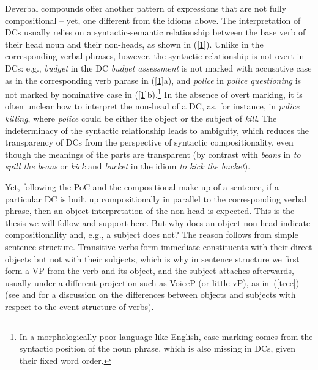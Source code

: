 \documentclass[output=paper]{langsci/langscibook}
\begin{document}
 {Deverbal compounds offer another pattern of expressions that are not fully compositional -- yet, one different from the idioms above. The interpretation of DCs usually relies on a syntactic-semantic relationship between the base verb of their head noun and their non-heads, as shown in (\ref{1}). Unlike in the corresponding verbal phrases, however, the syntactic relationship is not overt in DCs: e.g., \textit{budget} in the DC \textit{budget assessment} is not marked with accusative case as in the corresponding verb phrase in (\ref{1}a), and \textit{police} in \textit{police questioning} is not marked by nominative case in (\ref{1}b).}\footnote{ {In a morphologically poor language like English,  case marking comes from the syntactic position of the noun phrase, which is also missing in DCs, given their fixed word order.}}  {In the absence of overt marking, it is often unclear how to interpret the non-head of a DC, as, for instance, in \textit{police killing}, where \textit{police} could be either the object or the subject of \textit{kill}. The indeterminacy of the syntactic relationship leads to ambiguity, which reduces the transparency of DCs from the perspective of syntactic compositionality, even though the meanings of the parts are transparent (by contrast with \textit{beans} in \textit{to spill the beans} or \textit{kick} and \textit{bucket} in the idiom \textit{to kick the bucket}).}


 {Yet, following the PoC and the compositional make-up of a sentence, if a particular DC is built up compositionally in parallel to the corresponding verbal phrase, then an object interpretation of the non-head is expected. This is the thesis we will follow and support  here. But why does an object non-head indicate compositionality and, e.g., a subject does not? The reason follows from simple sentence structure. Transitive verbs form immediate constituents with their direct objects but not with their subjects, which is why in sentence structure we first form a VP from the verb and its object, and the subject attaches afterwards, usually under a different projection such as VoiceP (or little vP), as in~(\ref{tree}) (see \citealt{chomsky:95} and \citealt{kratzer:96} for a discussion on the differences between objects and subjects with respect to the event structure of verbs).}

\begin{exe}
\end{exe}
\end{document}

